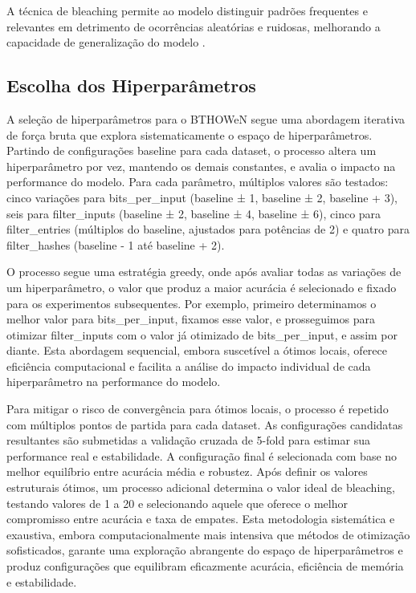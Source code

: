 \documentclass{article}
\begin{document}
A técnica de bleaching permite ao modelo distinguir padrões frequentes e relevantes em detrimento de ocorrências aleatórias e ruidosas, melhorando a capacidade de generalização do modelo \cite{santiago2020}.

\subsection{Escolha dos Hiperparâmetros}

A seleção de hiperparâmetros para o BTHOWeN segue uma abordagem iterativa de força bruta que explora sistematicamente o espaço de hiperparâmetros. Partindo de configurações baseline para cada dataset, o processo altera um hiperparâmetro por vez, mantendo os demais constantes, e avalia o impacto na performance do modelo. Para cada parâmetro, múltiplos valores são testados: cinco variações para bits\_per\_input (baseline ± 1, baseline ± 2, baseline + 3), seis para filter\_inputs (baseline ± 2, baseline ± 4, baseline ± 6), cinco para filter\_entries (múltiplos do baseline, ajustados para potências de 2) e quatro para filter\_hashes (baseline - 1 até baseline + 2).

O processo segue uma estratégia greedy, onde após avaliar todas as variações de um hiperparâmetro, o valor que produz a maior acurácia é selecionado e fixado para os experimentos subsequentes. Por exemplo, primeiro determinamos o melhor valor para bits\_per\_input, fixamos esse valor, e prosseguimos para otimizar filter\_inputs com o valor já otimizado de bits\_per\_input, e assim por diante. Esta abordagem sequencial, embora suscetível a ótimos locais, oferece eficiência computacional e facilita a análise do impacto individual de cada hiperparâmetro na performance do modelo.

Para mitigar o risco de convergência para ótimos locais, o processo é repetido com múltiplos pontos de partida para cada dataset. As configurações candidatas resultantes são submetidas a validação cruzada de 5-fold para estimar sua performance real e estabilidade. A configuração final é selecionada com base no melhor equilíbrio entre acurácia média e robustez. Após definir os valores estruturais ótimos, um processo adicional determina o valor ideal de bleaching, testando valores de 1 a 20 e selecionando aquele que oferece o melhor compromisso entre acurácia e taxa de empates. Esta metodologia sistemática e exaustiva, embora computacionalmente mais intensiva que métodos de otimização sofisticados, garante uma exploração abrangente do espaço de hiperparâmetros e produz configurações que equilibram eficazmente acurácia, eficiência de memória e estabilidade.
\end{document}
